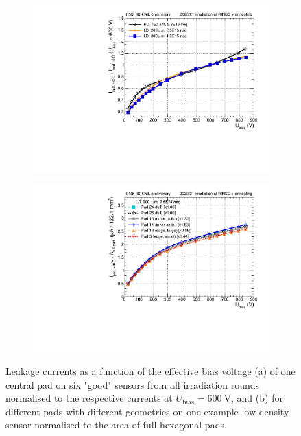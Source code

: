 \begin{figure}
	\captionsetup[subfigure]{aboveskip=-1pt,belowskip=-1pt}
	\centering
	\begin{subfigure}[b]{0.49\textwidth}
		\includegraphics[width=0.999\textwidth]{plots/channel_iv/channel_IV_sensors_sensors.pdf}
		\subcaption{
		}
		\label{plot:pad_IV_sensor}
	\end{subfigure}
	\hfill
	\begin{subfigure}[b]{0.49\textwidth}
		\includegraphics[width=0.999\textwidth]{plots/channel_iv/channel_IV_sensors_channels.pdf}
		\subcaption{
		}
		\label{plot:pad_IV_channels}
	\end{subfigure}
	\caption{
		Leakage currents as a function of the effective bias voltage (a) of one central pad on six "good" sensors from all irradiation rounds normalised to the respective currents at $U_\text{bias}=\SI{600}{\volt}$, 
		and (b) for different pads with different geometries on one example low density sensor normalised to the area of full hexagonal pads.
	}
\end{figure}



